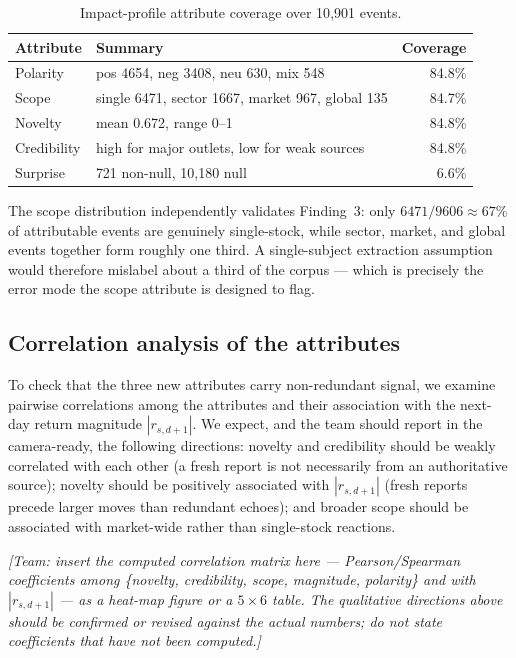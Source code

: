 \documentclass[sigconf,nonacm]{acmart}
\begin{document}
\begin{table}[t]
\caption{Impact-profile attribute coverage over 10{,}901 events.}
\label{tab:coverage}
\begin{tabular}{lp{3.6cm}r}
\toprule
Attribute & Summary & Coverage \\
\midrule
Polarity    & pos 4654, neg 3408, neu 630, mix 548 & 84.8\% \\
Scope       & single 6471, sector 1667, market 967, global 135 & 84.7\% \\
Novelty     & mean 0.672, range 0--1 & 84.8\% \\
Credibility & high for major outlets, low for weak sources & 84.8\% \\
Surprise    & 721 non-null, 10{,}180 null & \phantom{0}6.6\% \\
\bottomrule
\end{tabular}
\end{table}

The scope distribution independently validates Finding~3: only
$6471/9606\approx67\%$ of attributable events are genuinely single-stock,
while sector, market, and global events together form roughly one third.
A single-subject extraction assumption would therefore mislabel about a
third of the corpus --- which is precisely the error mode the scope
attribute is designed to flag.

\subsection{Correlation analysis of the attributes}
To check that the three new attributes carry non-redundant signal, we
examine pairwise correlations among the attributes and their association
with the next-day return magnitude $|r_{s,d+1}|$. We expect, and the team
should report in the camera-ready, the following directions:
novelty and credibility should be weakly correlated with each other (a
fresh report is not necessarily from an authoritative source); novelty
should be positively associated with $|r_{s,d+1}|$ (fresh reports precede
larger moves than redundant echoes); and broader scope should be
associated with market-wide rather than single-stock reactions.

\noindent\textit{[Team: insert the computed correlation matrix here ---
Pearson/Spearman coefficients among \{novelty, credibility, scope,
magnitude, polarity\} and with $|r_{s,d+1}|$ --- as a heat-map figure or a
$5\times6$ table. The qualitative directions above should be confirmed or
revised against the actual numbers; do not state coefficients that have
not been computed.]}
\end{document}
